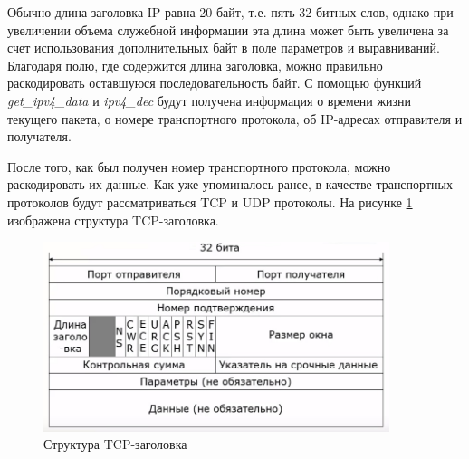 \documentclass[bachelor, och, coursework]{SCWorks}
\begin{document}
    Обычно длина заголовка IP равна 20 байт, т.е. пять 32-битных слов, однако при увеличении объема служебной информации эта длина может быть увеличена
    за счет использования дополнительных байт в поле параметров и выравниваний. Благодаря полю, где содержится
    длина заголовка, можно правильно раскодировать оставшуюся последовательность байт. С помощью функций \textit{get\_ipv4\_data} и \textit{ipv4\_dec}
    будут получена информация о времени жизни текущего пакета, о номере транспортного протокола, об IP-адресах отправителя и получателя.
  
      
      
      

    После того, как был получен номер транспортного протокола, можно раскодировать их данные. Как уже упоминалось ранее,
    в качестве транспортных протоколов будут рассматриваться TCP и UDP протоколы. На рисунке \ref{tcp-header} изображена структура TCP-заголовка.
  
    \begin{figure}[H]
      \centering
      \includegraphics[width=0.9\textwidth]{photo/tcp-segment.jpg}
      \caption{Структура TCP-заголовка}
      \label{tcp-header}
    \end{figure}
    
\end{document}
